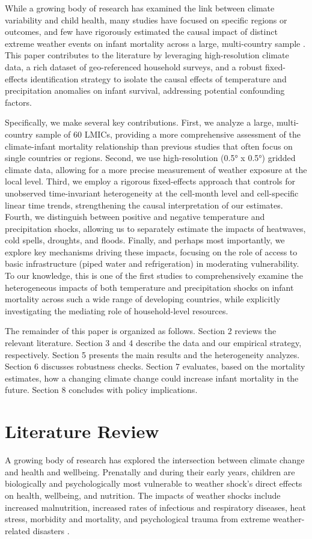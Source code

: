 \documentclass[a4paper]{article}
\begin{document}
While a growing body of research has examined the link between climate variability and child health, many studies have focused on specific regions or outcomes, and few have rigorously estimated the causal impact of distinct extreme weather events on infant mortality across a large, multi-country sample \cite{burgess2017,deschenes2009}.  This paper contributes to the literature by leveraging high-resolution climate data, a rich dataset of geo-referenced household surveys, and a robust fixed-effects identification strategy to isolate the causal effects of temperature and precipitation anomalies on infant survival, addressing potential confounding factors.

Specifically, we make several key contributions. First, we analyze a large, multi-country sample of 60 LMICs, providing a more comprehensive assessment of the climate-infant mortality relationship than previous studies that often focus on single countries or regions.  Second, we use high-resolution (0.5° x 0.5°) gridded climate data, allowing for a more precise measurement of weather exposure at the local level. Third, we employ a rigorous fixed-effects approach that controls for unobserved time-invariant heterogeneity at the cell-month level and cell-specific linear time trends, strengthening the causal interpretation of our estimates.  Fourth, we distinguish between positive and negative temperature and precipitation shocks, allowing us to separately estimate the impacts of heatwaves, cold spells, droughts, and floods. Finally, and perhaps most importantly, we explore key mechanisms driving these impacts, focusing on the role of access to basic infrastructure (piped water and refrigeration) in moderating vulnerability.  To our knowledge, this is one of the first studies to comprehensively examine the heterogeneous impacts of both temperature and precipitation shocks on infant mortality across such a wide range of developing countries, while explicitly investigating the mediating role of household-level resources.

The remainder of this paper is organized as follows. Section 2 reviews the relevant literature. Section 3 and 4 describe the data and our empirical strategy, respectively. Section 5 presents the main results and the heterogeneity analyzes. Section 6 discusses robustness checks. Section 7 evaluates, based on the mortality estimates, how a changing climate change could increase infant mortality in the future. Section 8 concludes with policy implications.


\section{Literature Review}
A growing body of research has explored the intersection between climate change and health and wellbeing. Prenatally and during their early years, children are biologically and psychologically most vulnerable to weather shock's direct effects on health, wellbeing, and nutrition. The impacts of weather shocks include increased malnutrition, increased rates of infectious and respiratory diseases, heat stress, morbidity and mortality, and psychological trauma from extreme weather-related disasters \cite{caruso2024}.  
\end{document}
